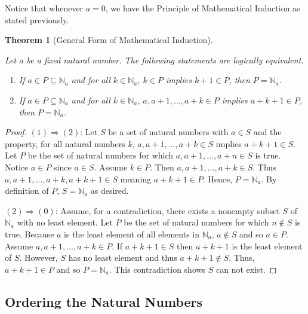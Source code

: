\documentclass[
  twoside,
  12pt,
  letterpaper]{article}
\providecommand{\tightlist}{%
  \setlength{\itemsep}{0pt}\setlength{\parskip}{0pt}}\usepackage{longtable,booktabs,array}
\theoremstyle{definition}
\theoremstyle{definition}
\theoremstyle{definition}
\theoremstyle{plain}
\theoremstyle{plain}
\newtheorem{theorem}{Theorem}[section]
\theoremstyle{remark}
\begin{document}
Notice that whenever \(a=0\), we have the Principle of Mathematical
Induction as stated previously.

\begin{theorem}[General Form of Mathematical
Induction]\protect\hypertarget{thm-mathematical-induction-equivalence}{}\label{thm-mathematical-induction-equivalence}

Let \(a\) be a fixed natural number. The following statements are
logically equivalent.

\begin{enumerate}
\def\labelenumi{\arabic{enumi}.}
\tightlist
\item
  If \(a\in P\subseteq\mathbb{N}_a\) and for all \(k\in \mathbb{N}_a\),
  \(k \in P\) implies \(k+1 \in P\), then \(P=\mathbb{N}_a\).
\item
  If \(a\in P\subseteq\mathbb{N}_a\) and for all \(k\in \mathbb{N}_a\),
  \(a,a+1,\ldots,a+k \in P\) implies \(a+k+1 \in P\), then
  \(P=\mathbb{N}_a\).
\end{enumerate}

\end{theorem}

\begin{proof}

\((1)\Rightarrow (2)\): Let \(S\) be a set of natural numbers with
\(a\in S\) and the property, for all natural numbers \(k\),
\(a,a+1,\ldots,a+k\in S\) implies \(a+k+1\in S\). Let \(P\) be the set
of natural numbers for which \(a,a+1, \ldots, a+n\in S\) is true. Notice
\(a\in P\) since \(a\in S\). Assume \(k\in P\). Then
\(a,a+1, \ldots, a+k\in S\). Thus \(a,a+1,\ldots, a+k, a+k+1\in S\)
meaning \(a+k+1\in P\). Hence, \(P=\mathbb{N}_a\). By definition of
\(P\), \(S=\mathbb{N}_a\) as desired.

\((2)\Rightarrow (0)\): Assume, for a contradiction, there exists a
nonempty subset \(S\) of \(\mathbb{N}_a\) with no least element. Let
\(P\) be the set of natural numbers for which \(n\notin S\) is true.
Because \(a\) is the least element of all elements in \(\mathbb{N}_a\),
\(a\notin S\) and so \(a\in P\). Assume \(a,a+1,\ldots,a+k\in P\). If
\(a+k+1\in S\) then \(a+k+1\) is the least element of \(S\). However,
\(S\) has no least element and thus \(a+k+1\notin S\). Thus,
\(a+k+1\in P\) and so \(P=\mathbb{N}_a\). This contradiction shows \(S\)
can not exist.

\end{proof}

\hypertarget{ordering-the-natural-numbers}{%
\subsection{Ordering the Natural
Numbers}\label{ordering-the-natural-numbers}}
\end{document}
